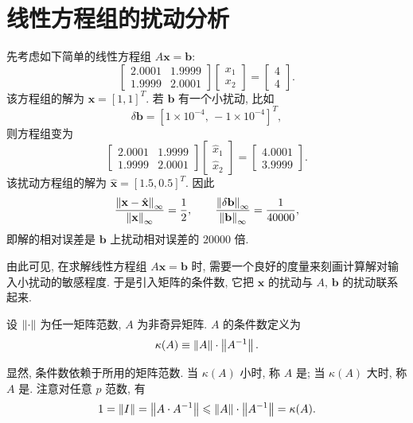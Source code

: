 \section{线性方程组的扰动分析}

先考虑如下简单的线性方程组 $A\mathbf{x}=\mathbf{b}$:
\[
  \begin{bmatrix}
    2.0001 & 1.9999\\
    1.9999 & 2.0001
  \end{bmatrix}
  \begin{bmatrix}
    x_1\\ x_2
  \end{bmatrix}
  =
  \begin{bmatrix}
    4\\ 4
  \end{bmatrix}.
\]
该方程组的解为 $\mathbf{x}=[1,1]^T$. 若 $\mathbf{b}$ 有一个小扰动, 比如
\[
  \delta\mathbf{b}=[1\times10^{-4},\,-1\times10^{-4}]^T,
\]
则方程组变为
\[
  \begin{bmatrix}
    2.0001 & 1.9999\\
    1.9999 & 2.0001
  \end{bmatrix}
  \begin{bmatrix}
    \hat{x}_1\\ \hat{x}_2
  \end{bmatrix}
  =
  \begin{bmatrix}
    4.0001\\ 3.9999
  \end{bmatrix}.
\]
该扰动方程组的解为 $\hat{\mathbf{x}}=[1.5,0.5]^T$. 因此
\[
  \frac{\left\|\mathbf{x}-\hat{\mathbf{x}}\right\|_\infty}{\left\|\mathbf{x}\right\|_\infty}=\frac{1}{2},
  \qquad
  \frac{\left\|\delta\mathbf{b}\right\|_\infty}{\left\|\mathbf{b}\right\|_\infty}=\frac{1}{40000},
\]
即解的相对误差是 $\mathbf{b}$ 上扰动相对误差的 $20000$ 倍.

由此可见, 在求解线性方程组 $A\mathbf{x}=\mathbf{b}$ 时, 需要一个良好的度量来刻画计算解对输入小扰动的敏感程度. 于是引入矩阵的条件数, 它把 $\mathbf{x}$ 的扰动与 $A$, $\mathbf{b}$ 的扰动联系起来.

\begin{definition}
\label{def:3-5}
设 $\left\|\cdot\right\|$ 为任一矩阵范数, $A$ 为非奇异矩阵. $A$ 的条件数定义为
\begin{equation}
  \kappa(A)\equiv\left\|A\right\|\cdot\left\|A^{-1}\right\|.
  \label{eq:3-1}
\end{equation}
\end{definition}

显然, 条件数依赖于所用的矩阵范数. 当 $\kappa(A)$ 小时, 称 $A$ 是; 当 $\kappa(A)$ 大时, 称 $A$ 是. 注意对任意 $p$ 范数, 有
\[
  1=\left\|I\right\|=\left\|A\cdot A^{-1}\right\|\leqslant\left\|A\right\|\cdot\left\|A^{-1}\right\|=\kappa(A).
\]

